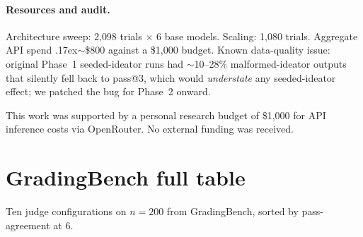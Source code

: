 \documentclass{article}
\begin{document}
\paragraph{Resources and audit.}
Architecture sweep: 2{,}098 trials $\times$ 6 base models.
Scaling: 1{,}080 trials.
Aggregate API spend {\raise.17ex\hbox{$\scriptstyle\sim$}}\$800 against a \$1{,}000 budget.
Known data-quality issue: original Phase~1 seeded-ideator runs had
$\sim$10--28\% malformed-ideator outputs that silently fell back to pass@3,
which would \emph{understate} any seeded-ideator effect; we patched the bug for
Phase~2 onward.



\begin{ack}
This work was supported by a personal research budget of \$1{,}000 for API
inference costs via OpenRouter. No external funding was received.
\end{ack}


{\small


}

\appendix

\section{GradingBench full table}
\label{app:gradingbench}

Ten judge configurations on $n{=}200$ from GradingBench, sorted by pass-agreement at 6.
\end{document}
